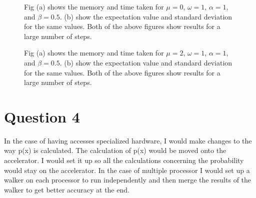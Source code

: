 \documentclass{article}
\begin{document}
\begin{figure}[!ht]
\centering
{}  

\caption{Fig (a) shows the memory and time taken for $\mu=0$, $\omega=1$, $\alpha=1$, and $\beta=0.5$. (b) show the expectation value and standard deviation for the same values. Both of the above figures show results for a large number of steps.}
\label{long}
\end{figure}

\begin{figure}[!ht]
\centering
{}  

\caption{Fig (a) shows the memory and time taken for $\mu=2$, $\omega=1$, $\alpha=1$, and $\beta=0.5$. (b) show the expectation value and standard deviation for the same values. Both of the above figures show results for a large number of steps.}
\label{long2}
\end{figure}


\section{Question 4}

In the case of having accesses specialized hardware,  I would make changes to the way p(x) is calculated. The calculation of p(x) would be moved onto the accelerator. I would set it up so all the calculations concerning the probability would stay on the accelerator.  In the case of multiple processor I would set up a walker on each processor to run independently and then merge the results of the walker to get better accuracy at the end.



{}%


 
\end{document}

